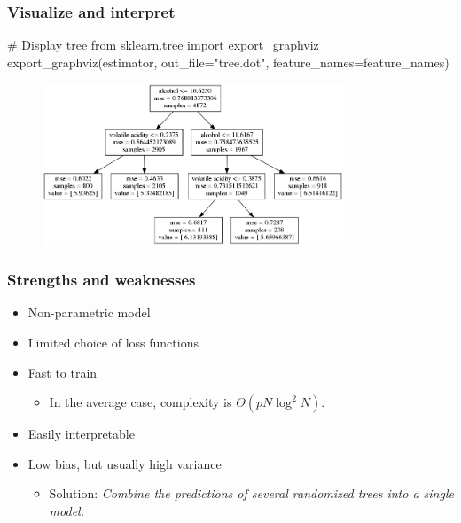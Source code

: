 \documentclass{beamer}
\begin{document}
\begin{frame}[fragile]
\frametitle{Visualize and interpret}

{\footnotesize
\begin{pythoncode}
# Display tree
from sklearn.tree import export_graphviz
export_graphviz(estimator, out_file="tree.dot",
                feature_names=feature_names)
\end{pythoncode}
}

\begin{figure}
\includegraphics[width=0.8\textwidth]{./figures/wine-tree.png}
\end{figure}

\end{frame}

\begin{frame}
  \frametitle{Strengths and weaknesses}

  \begin{itemize}
    \item {\color{blue} Non-parametric} model

    \vspace{0.25cm}

    \item {\color{red}Limited choice} of loss functions

    \vspace{0.25cm}

    \item {\color{blue} Fast} to train
        \begin{itemize}
            \item In the average case, complexity is $\Theta(pN\log^2 N)$.
        \end{itemize}

    \vspace{0.25cm}

    \item Easily {\color{blue} interpretable}

    \vspace{0.25cm}

    \item {\color{blue} Low bias}, but usually {\color{red} high variance}\\
        \begin{itemize}
            \item Solution: {\it Combine the predictions of several randomized trees into a single model.}
        \end{itemize}
  \end{itemize}
\end{frame}
\end{document}
